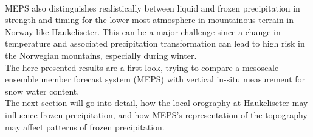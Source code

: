 \\
MEPS also distinguishes realistically between liquid and frozen precipitation in strength and timing for the lower most atmosphere in mountainous terrain in Norway like Haukeliseter.
This can be a major challenge since a change in temperature and associated precipitation transformation can lead to high risk in the Norwegian mountains, especially during winter. 
\\
The here presented results are a first look, trying to compare a mesoscale ensemble member forecast system (MEPS) with vertical in-situ measurement for snow water content.
\\
The next section will go into detail, how the local orography at Haukeliseter may influence frozen precipitation, and how MEPS's representation of the topography may affect patterns of frozen precipitation. 






